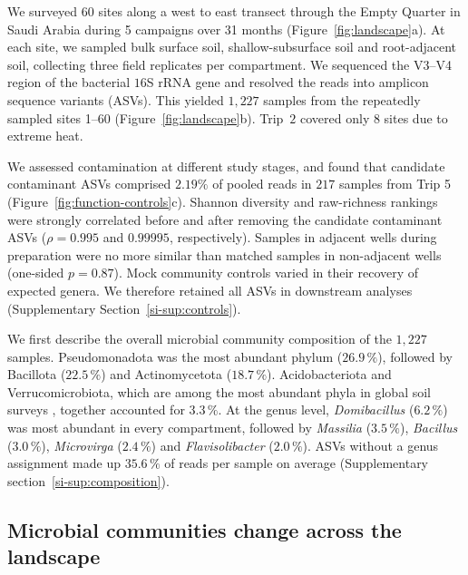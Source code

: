 \documentclass[fleqn,10pt,numbers]{olplainarticle}
\begin{document}
We surveyed 60 sites along a west to east transect through the Empty Quarter in Saudi Arabia during 5 campaigns over 31 months (Figure~\ref{fig:landscape}a). At each site, we sampled bulk surface soil, shallow-subsurface soil and root-adjacent soil, collecting three field replicates per compartment. We sequenced the V3--V4 region of the bacterial $16$S rRNA gene and resolved the reads into amplicon sequence variants (ASVs). This yielded $1{,}227$ samples from the repeatedly sampled sites 1--60 (Figure~\ref{fig:landscape}b). Trip~$2$ covered only 8 sites due to extreme heat.

We assessed contamination at different study stages, and found that candidate contaminant ASVs comprised $2.19\%$ of pooled reads in $217$ samples from Trip 5 (Figure~\ref{fig:function-controls}c). Shannon diversity and raw-richness rankings were strongly correlated before and after removing the candidate contaminant ASVs ($\rho = 0.995$ and $0.99995$, respectively). Samples in adjacent wells during preparation were no more similar than matched samples in non-adjacent wells (one-sided $p=0.87$). Mock community controls varied in their recovery of expected genera. We therefore retained all ASVs in downstream analyses (Supplementary Section~\ref{si-sup:controls}).

We first describe the overall microbial community composition of the $1{,}227$ samples. Pseudomonadota was the most abundant phylum ($26.9\,\%$), followed by Bacillota ($22.5\,\%$) and Actinomycetota ($18.7\,\%$). Acidobacteriota and Verrucomicrobiota, which are among the most abundant phyla in global soil surveys \cite{delgadobaquerizo2018global,fierer2017embracing}, together accounted for $3.3\,\%$. At the genus level, \textit{Domibacillus} ($6.2\,\%$) was most abundant in every compartment, followed by \textit{Massilia} ($3.5\,\%$), \textit{Bacillus} ($3.0\,\%$), \textit{Microvirga} ($2.4\,\%$) and \textit{Flavisolibacter} ($2.0\,\%$). ASVs without a genus assignment made up $35.6\,\%$ of reads per sample on average (Supplementary section~\ref{si-sup:composition}).

\subsection*{Microbial communities change across the landscape}
\end{document}
